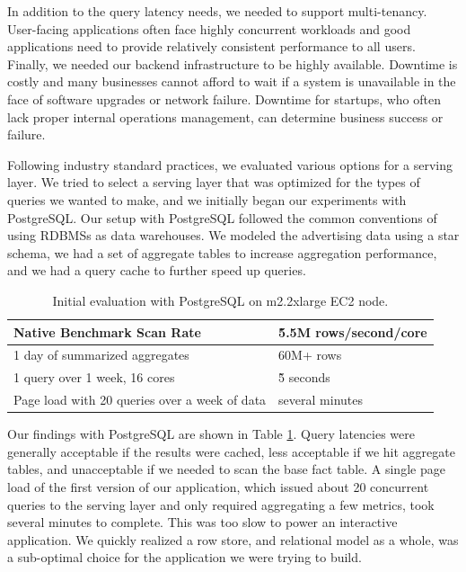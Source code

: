 \documentclass{vldb}
\begin{document}
In addition to the query latency needs, we needed to support multi-tenancy.
User-facing applications often face highly concurrent workloads and good
applications need to provide relatively consistent performance to all users.
Finally, we needed our backend infrastructure to be highly available. Downtime
is costly and many businesses cannot afford to wait if a system is unavailable
in the face of software upgrades or network failure. Downtime for startups, who
often lack proper internal operations management, can determine business
success or failure.
 
Following industry standard practices, we evaluated various options for a
serving layer. We tried to select a serving layer that was optimized for the
types of queries we wanted to make, and we initially began our experiments with
PostgreSQL\cite{stonebraker1987extendability}. Our setup with PostgreSQL
followed the common conventions of using RDBMSs as data warehouses. We modeled
the advertising data using a star schema, we had a set of aggregate tables to
increase aggregation performance, and we had a query cache to further speed up
queries.

\begin{table}
  \centering
  \scriptsize\begin{tabular}{| l | l |}
    \hline
    Native Benchmark Scan Rate & \~5.5M rows/second/core \\ \hline
    1 day of summarized aggregates & 60M+ rows \\ \hline
    1 query over 1 week, 16 cores & \~5 seconds \\ \hline
    Page load with 20 queries over a week of data & several minutes \\ \hline
  \end{tabular}
  \normalsize
  \caption{Initial evaluation with PostgreSQL on m2.2xlarge EC2 node.}
  \label{tab:postgres_results}
\end{table}
 
Our findings with PostgreSQL are shown in Table \ref{tab:postgres_results}.
Query latencies were generally acceptable if the results were cached, less
acceptable if we hit aggregate tables, and unacceptable if we needed to scan
the base fact table. A single page load of the first version of our
application, which issued about 20 concurrent queries to the serving layer and
only required aggregating a few metrics, took several minutes to complete. This
was too slow to power an interactive application. We quickly realized a row
store, and relational model as a whole, was a sub-optimal choice for the
application we were trying to build.
\end{document}
